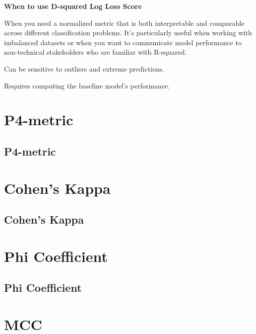 \textbf{When to use D-squared Log Loss Score}

When you need a normalized metric that is both interpretable and comparable across different classification problems. It's particularly useful when working with imbalanced
datasets or when you want to communicate model performance to non-technical stakeholders who are familiar with R-squared.

{
    \item Can be sensitive to outliers and extreme predictions.
    \item Requires computing the baseline model's performance.
}


\clearpage
\thispagestyle{classificationstyle}
\section{P4-metric}
\subsection{P4-metric}

\clearpage
\thispagestyle{classificationstyle}
\section{Cohen's Kappa}
\subsection{Cohen's Kappa}

\clearpage
\thispagestyle{classificationstyle}
\section{Phi Coefficient}
\subsection{Phi Coefficient}

\clearpage
\thispagestyle{classificationstyle}
\section{MCC}
